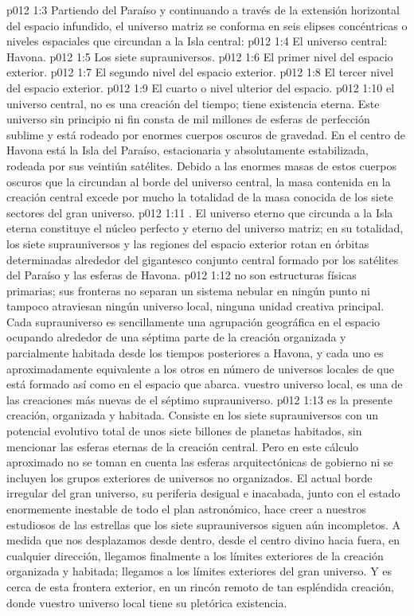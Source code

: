 \vs p012 1:3 \pc Partiendo del Paraíso y continuando a través de la extensión horizontal del espacio infundido, el universo matriz se conforma en seis elipses concéntricas o niveles espaciales que circundan a la Isla central:
\vs p012 1:4 El universo central: Havona.
\vs p012 1:5 Los siete suprauniversos.
\vs p012 1:6 El primer nivel del espacio exterior.
\vs p012 1:7 El segundo nivel del espacio exterior.
\vs p012 1:8 El tercer nivel del espacio exterior.
\vs p012 1:9 El cuarto o nivel ulterior del espacio.
\vs p012 1:10 \pc {} el universo central, no es una creación del tiempo; tiene existencia eterna. Este universo sin principio ni fin consta de mil millones de esferas de perfección sublime y está rodeado por enormes cuerpos oscuros de gravedad. En el centro de Havona está la Isla del Paraíso, estacionaria y absolutamente estabilizada, rodeada por sus veintiún satélites. Debido a las enormes masas de estos cuerpos oscuros que la circundan al borde del universo central, la masa contenida en la creación central excede por mucho la totalidad de la masa conocida de los siete sectores del gran universo.
\vs p012 1:11 \pc {}. El universo eterno que circunda a la Isla eterna constituye el núcleo perfecto y eterno del universo matriz; en su totalidad, los siete suprauniversos y las regiones del espacio exterior rotan en órbitas determinadas alrededor del gigantesco conjunto central formado por los satélites del Paraíso y las esferas de Havona.
\vs p012 1:12  no son estructuras físicas primarias; sus fronteras no separan un sistema nebular en ningún punto ni tampoco atraviesan ningún universo local, ninguna unidad creativa principal. Cada suprauniverso es sencillamente una agrupación geográfica en el espacio ocupando alrededor de una séptima parte de la creación organizada y parcialmente habitada desde los tiempos posteriores a Havona, y cada uno es aproximadamente equivalente a los otros en número de universos locales de que está formado así como en el espacio que abarca.  vuestro universo local, es una de las creaciones más nuevas de  el séptimo suprauniverso.
\vs p012 1:13  es la presente creación, organizada y habitada. Consiste en los siete suprauniversos con un potencial evolutivo total de unos siete billones de planetas habitados, sin mencionar las esferas eternas de la creación central. Pero en este cálculo aproximado no se toman en cuenta las esferas arquitectónicas de gobierno ni se incluyen los grupos exteriores de universos no organizados. El actual borde irregular del gran universo, su periferia desigual e inacabada, junto con el estado enormemente inestable de todo el plan astronómico, hace creer a nuestros estudiosos de las estrellas que los siete suprauniversos siguen aún incompletos. A medida que nos desplazamos desde dentro, desde el centro divino hacia fuera, en cualquier dirección, llegamos finalmente a los límites exteriores de la creación organizada y habitada; llegamos a los límites exteriores del gran universo. Y es cerca de esta frontera exterior, en un rincón remoto de tan espléndida creación, donde vuestro universo local tiene su pletórica existencia.
